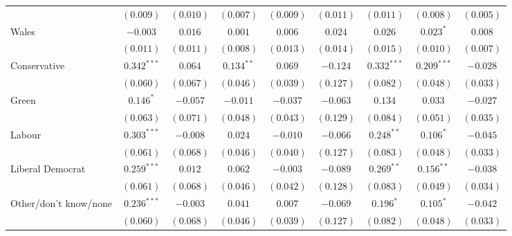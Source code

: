 \documentclass{article}
\begin{document}
\begin{table}
\begin{center}
{\begin{tabular}{l c c c c c c c c }
                                 & $(0.009)$      & $(0.010)$      & $(0.007)$      & $(0.009)$      & $(0.011)$      & $(0.011)$      & $(0.008)$      & $(0.005)$      \\
Wales                            & $-0.003$       & $0.016$        & $0.001$        & $0.006$        & $0.024$        & $0.026$        & $0.023^{*}$    & $0.008$        \\
                                 & $(0.011)$      & $(0.011)$      & $(0.008)$      & $(0.013)$      & $(0.014)$      & $(0.015)$      & $(0.010)$      & $(0.007)$      \\
Conservative                     & $0.342^{***}$  & $0.064$        & $0.134^{**}$   & $0.069$        & $-0.124$       & $0.332^{***}$  & $0.209^{***}$  & $-0.028$       \\
                                 & $(0.060)$      & $(0.067)$      & $(0.046)$      & $(0.039)$      & $(0.127)$      & $(0.082)$      & $(0.048)$      & $(0.033)$      \\
Green                            & $0.146^{*}$    & $-0.057$       & $-0.011$       & $-0.037$       & $-0.063$       & $0.134$        & $0.033$        & $-0.027$       \\
                                 & $(0.063)$      & $(0.071)$      & $(0.048)$      & $(0.043)$      & $(0.129)$      & $(0.084)$      & $(0.051)$      & $(0.035)$      \\
Labour                           & $0.303^{***}$  & $-0.008$       & $0.024$        & $-0.010$       & $-0.066$       & $0.248^{**}$   & $0.106^{*}$    & $-0.045$       \\
                                 & $(0.061)$      & $(0.068)$      & $(0.046)$      & $(0.040)$      & $(0.127)$      & $(0.083)$      & $(0.048)$      & $(0.033)$      \\
Liberal Democrat                 & $0.259^{***}$  & $0.012$        & $0.062$        & $-0.003$       & $-0.089$       & $0.269^{**}$   & $0.156^{**}$   & $-0.038$       \\
                                 & $(0.061)$      & $(0.068)$      & $(0.046)$      & $(0.042)$      & $(0.128)$      & $(0.083)$      & $(0.049)$      & $(0.034)$      \\
Other/don't know/none            & $0.236^{***}$  & $-0.003$       & $0.041$        & $0.007$        & $-0.069$       & $0.196^{*}$    & $0.105^{*}$    & $-0.042$       \\
                                 & $(0.060)$      & $(0.068)$      & $(0.046)$      & $(0.039)$      & $(0.127)$      & $(0.082)$      & $(0.048)$      & $(0.033)$      \\

\end{tabular}}
\end{center}
\end{table}
\end{document}
